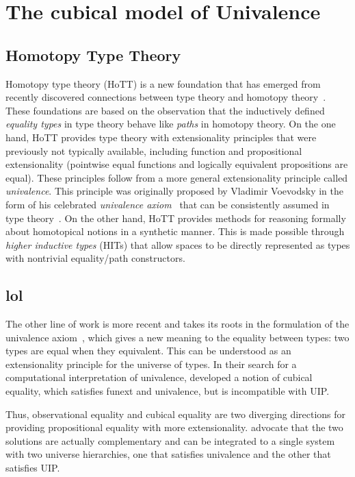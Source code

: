 \setchapterpreamble[u]{\margintoc}
\chapter{The cubical model of Univalence}

\section{Homotopy Type Theory}

Homotopy type theory (HoTT) is a new foundation that has emerged from
recently discovered connections between type theory and homotopy
theory~. These foundations are based on the
observation that the inductively defined \emph{equality types} in type
theory behave like \emph{paths} in homotopy theory. On the one hand,
HoTT provides type theory with extensionality principles that were
previously not typically available, including function and
propositional extensionality (pointwise equal functions and logically
equivalent propositions are equal). These principles follow from a
more general extensionality principle called \emph{univalence}. This
principle was originally proposed by Vladimir Voevodsky in the form of
his celebrated \emph{univalence axiom}~ that can be
consistently assumed in type theory~. On
the other hand, HoTT provides methods for reasoning formally about
homotopical notions in a synthetic manner. This is made possible
through \emph{higher inductive types} (HITs) that allow spaces to be
directly represented as types with nontrivial equality/path
constructors.

\section{lol}

The other line of work is more recent and takes its roots in the
formulation of the univalence axiom~,
which gives a new meaning to the equality between types: two types are
equal when they equivalent. This can be understood as an extensionality
principle for the universe of types.
%
In their search for a computational interpretation of
univalence,  developed a notion of cubical equality,
which satisfies funext and univalence, but is incompatible with UIP.

Thus, observational equality and cubical equality are two diverging
directions for providing propositional equality with more extensionality.
 advocate that the
two solutions are actually complementary and can be integrated to
a single system with two universe hierarchies, one that satisfies
univalence and the other that satisfies UIP.


